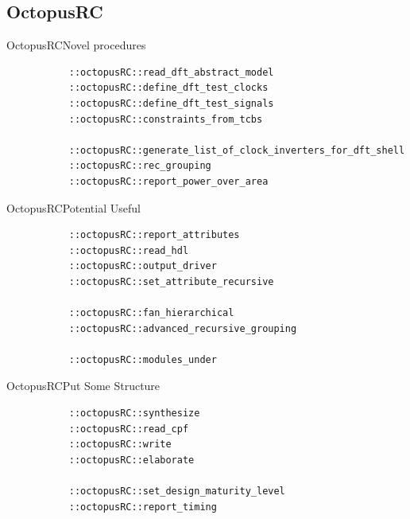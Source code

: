 \documentclass[handout]{beamer}
\begin{document}
\subsection{OctopusRC}
\begin{frame}[fragile]{OctopusRC}{Novel procedures}
	{\small
	\begin{verbatim}
           ::octopusRC::read_dft_abstract_model
           ::octopusRC::define_dft_test_clocks
           ::octopusRC::define_dft_test_signals
           ::octopusRC::constraints_from_tcbs
           
           ::octopusRC::generate_list_of_clock_inverters_for_dft_shell
           ::octopusRC::rec_grouping
           ::octopusRC::report_power_over_area
           \end{verbatim}
	}
\end{frame}
\begin{frame}[fragile]{OctopusRC}{Potential Useful}
	{\small
	\begin{verbatim}      
           ::octopusRC::report_attributes
           ::octopusRC::read_hdl
           ::octopusRC::output_driver
           ::octopusRC::set_attribute_recursive
           
           ::octopusRC::fan_hierarchical
           ::octopusRC::advanced_recursive_grouping
                   
           ::octopusRC::modules_under
	\end{verbatim}
	}
\end{frame}
\begin{frame}[fragile]{OctopusRC}{Put Some Structure}
	{\small
	\begin{verbatim}             
           ::octopusRC::synthesize
           ::octopusRC::read_cpf
           ::octopusRC::write
           ::octopusRC::elaborate
           
           ::octopusRC::set_design_maturity_level
           ::octopusRC::report_timing
	\end{verbatim}
	}
\end{frame}
\end{document}
